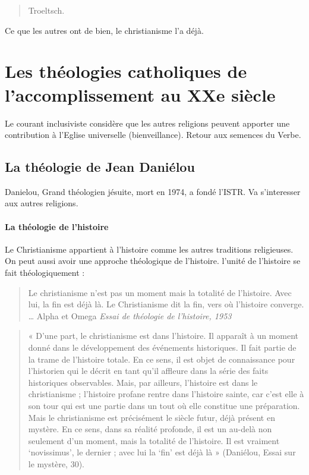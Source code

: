   \begin{quote}
      Troeltsch. 
  \end{quote}
  Ce que les autres ont de bien, le christianisme l'a déjà.
  
  
  \section{Les théologies catholiques de l'accomplissement au XXe siècle}
  
Le courant inclusiviste considère que les autres religions peuvent apporter une contribution à l'Eglise universelle (bienveillance). Retour aux semences du Verbe.


   
    
    \subsection{La théologie de Jean Daniélou}
    
Danielou, Grand théologien jésuite, mort en 1974, a fondé l'ISTR. Va s'interesser aux autres religions. 
  

     
      
      \paragraph{La théologie de l'histoire} Le Christianisme appartient à l'histoire comme les autres traditions religieuses. On peut aussi avoir une approche théologique de l'histoire. l'unité de l'histoire se fait théologiquement : 
      \begin{quote}
      
      Le christianisme n’est pas un moment mais la totalité de l’histoire. Avec lui, la fin est déjà là. Le Christianisme dit la fin, vers où l’histoire converge. … Alpha et Omega
\textit{Essai de théologie de l'histoire, 1953}
      \end{quote}
\begin{quote}
    «  D’une  part,  le  christianisme  est  dans  l’histoire.  Il  apparaît  à  un  moment  donné  dans  le développement  des  événements  historiques.  Il  fait  partie  de  la  trame  de  l’histoire  totale.  En  ce  sens,  il est  objet  de  connaissance  pour  l’historien  qui  le  décrit  en  tant  qu’il  affleure  dans  la  série  des  faits historiques  observables.  Mais,  par  ailleurs,  l’histoire  est  dans  le  christianisme  ;  l’histoire  profane rentre  dans  l’histoire  sainte,  car  c’est  elle  à  son  tour  qui  est  une  partie  dans  un  tout  où  elle  constitue une  préparation.  Mais  le  christianisme  est  précisément  le  siècle  futur,  déjà  présent  en  mystère.  En  ce sens,  dans  sa  réalité  profonde,  il  est  un  au-delà  non  seulement  d’un  moment,  mais  la  totalité  de l’histoire.  Il  est  vraiment  ‘novissimus’,  le  dernier  ;  avec  lui  la  ‘fin’  est  déjà  là  »  (Daniélou,  Essai  sur  le mystère, 30). 
\end{quote}




